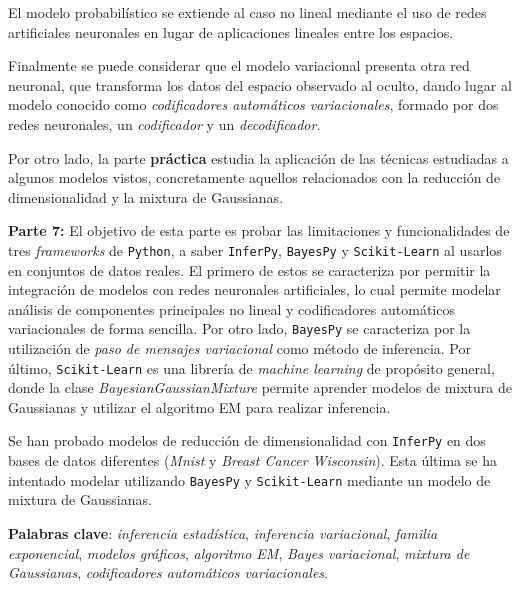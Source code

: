 El modelo probabilístico se extiende al caso no lineal mediante el uso de redes artificiales neuronales en lugar de aplicaciones lineales entre los espacios.

Finalmente se puede considerar que el modelo variacional presenta otra red neuronal, que transforma los datos del espacio observado al oculto, dando lugar al modelo conocido como \emph{codificadores automáticos variacionales}, formado por dos redes neuronales, un \emph{codificador} y un \emph{decodificador}.

Por otro lado, la parte \textbf{práctica} estudia la aplicación de las técnicas estudiadas a algunos modelos vistos, concretamente aquellos relacionados con la reducción de dimensionalidad y la mixtura de Gaussianas.

\textbf{Parte 7:} El objetivo de esta parte es probar las limitaciones y funcionalidades de tres \textit{frameworks} de \texttt{Python}, a saber \texttt{InferPy}, \texttt{BayesPy} y \texttt{Scikit-Learn} al usarlos en conjuntos de datos reales. El primero de estos se caracteriza por permitir la integración de modelos con redes neuronales artificiales, lo cual permite modelar análisis de componentes principales no lineal y codificadores automáticos variacionales de forma sencilla. Por otro lado, \texttt{BayesPy} se caracteriza por la utilización de \emph{paso de mensajes variacional} como método de inferencia. Por último, \texttt{Scikit-Learn} es una librería de \emph{machine learning} de propósito general, donde la clase \emph{BayesianGaussianMixture} permite aprender modelos de mixtura de Gaussianas y utilizar el algoritmo EM para realizar inferencia.

Se han probado modelos de reducción de dimensionalidad con \texttt{InferPy} en dos bases de datos diferentes (\emph{Mnist} y \emph{Breast Cancer Wisconsin}). Esta última se ha intentado modelar utilizando \texttt{BayesPy} y \texttt{Scikit-Learn} mediante un modelo de mixtura de Gaussianas.

\textbf{Palabras clave}: \emph{inferencia estadística}, \emph{inferencia variacional}, \emph{familia exponencial}, \emph{modelos gráficos}, \emph{algoritmo EM}, \emph{Bayes variacional}, \emph{mixtura de Gaussianas}, \emph{codificadores automáticos variacionales}.
